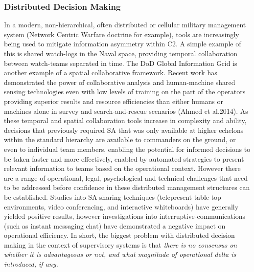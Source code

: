 \subsubsection{Distributed Decision Making}
In a modern, non-hierarchical, often distributed or cellular military management system (Network Centric Warfare doctrine for example), tools are increasingly being used to mitigate information asymmetry within C2.
A simple example of this is shared watch-logs in the Naval space, providing temporal collaboration between watch-teams separated in time.
The DoD Global Information Grid is another example of a spatial collaborative framework.
Recent work has demonstrated the power of collaborative analysis and human-machine shared sensing technologies even with low levels of training on the part of the operators providing superior results and resource efficiencies than either humans or machines alone in survey and search-and-rescue scenarios (Ahmed et al.2014).
As these temporal and spatial collaboration tools increase in complexity and ability, decisions that previously required SA that was only available at higher echelons within the standard hierarchy are available to commanders on the ground, or even to individual team members, enabling the potential for informed decisions to be taken faster and more effectively, enabled by automated strategies to present relevant information to teams based on the operational context.
However there are a range of operational, legal, psychological and technical challenges that need to be addressed before confidence in these distributed management structures can be established.
Studies into SA sharing techniques (telepresent table-top environments, video conferencing, and interactive whiteboards) have generally yielded positive results, however investigations into interruptive-communications (such as instant messaging chat) have demonstrated a negative impact on operational efficiency.
In short, the biggest problem with distributed decision making in the context of supervisory systems is that \textit{there is no consensus on whether it is advantageous or not, and what magnitude of operational delta is introduced, if any.}


